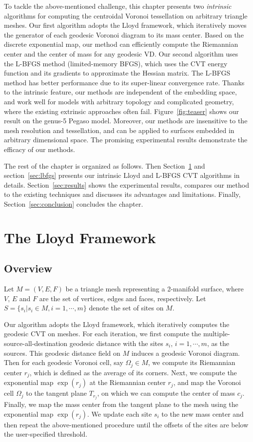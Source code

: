To tackle the above-mentioned challenge, this chapter presents two
\textit{intrinsic} algorithms for computing the centroidal Voronoi
tessellation on arbitrary triangle meshes. Our first algorithm
adopts the Lloyd framework, which iteratively moves the generator of
each geodesic Voronoi diagram to its mass center. Based on the
discrete exponential map, our method can efficiently compute the
Riemannian center and the center of mass for any geodesic VD. Our
second algorithm uses the L-BFGS method (limited-memory BFGS), which
uses the CVT energy function and its gradients to approximate the
Hessian matrix. The L-BFGS method has better performance due to its
super-linear convergence rate. Thanks to the intrinsic feature, our
methods are independent of the embedding space, and work well for
models with arbitrary topology and complicated geometry, where the
existing extrinsic approaches often fail. Figure~\ref{fig:teaser}
shows our result on the genus-5 Pegaso model. Moreover, our methods
are insensitive to the mesh resolution and tessellation, and can be
applied to surfaces embedded in arbitrary dimensional space. The
promising experimental results demonstrate the efficacy of our
methods.

The rest of the chapter is organized as follows.
Then Section~\ref{sec:lloyd} and section~\ref{sec:lbfgs} presents our intrinsic Lloyd and L-BFGS CVT algorithms in details. Section~\ref{sec:results} shows the experimental results, compares our method to the existing techniques and discusses its advantages and limitations. Finally, Section~\ref{sec:conclusion} concludes the chapter.


\section{The Lloyd Framework} \label{sec:lloyd}

\subsection{Overview} \label{subsec:overview}
Let $M=(V,E,F)$ be a triangle mesh representing a 2-manifold
surface, where $V$, $E$ and $F$ are the set of vertices, edges and
faces, respectively. Let $S=\{s_i|s_i\in M, i=1,\cdots, m\}$ denote
the set of sites on $M$.

Our algorithm adopts the Lloyd framework, which iteratively computes the geodesic CVT on meshes.
For each iteration, we first compute the multiple-source-all-destination geodesic distance with the sites $s_i$, $i=1,\cdots,m$, as the sources.
This geodesic distance field on $M$ induces a geodesic Voronoi diagram.
Then for each geodesic Voronoi cell, say $\Omega_j\in M$, we compute its Riemannian center $r_j$, which is defined as the average of its corners.
 Next, we compute the exponential map $\exp(r_j)$ at the Riemannian center $r_j$, and map the Voronoi cell $\Omega_j$ to the tangent plane $T_{r_j}$, on which we can compute the center of mass $c_j$. Finally, we map the mass center from the tangent plane to the mesh using the exponential map $\exp(r_j)$. We update each site $s_i$ to the new mass center and then repeat the above-mentioned procedure until the offsets of the sites are below the user-specified threshold.


